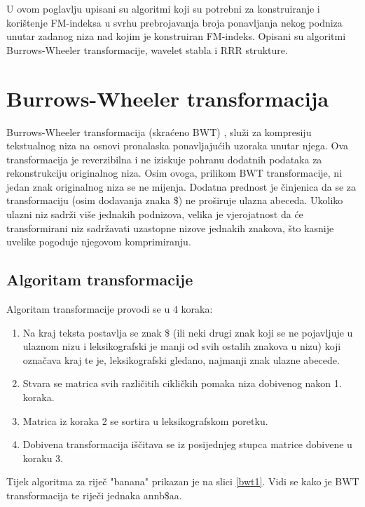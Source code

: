 U ovom poglavlju upisani su algoritmi koji su potrebni za konstruiranje i korištenje FM-indeksa u svrhu prebrojavanja broja ponavljanja nekog podniza unutar zadanog niza nad kojim je konstruiran FM-indeks. Opisani su algoritmi Burrows-Wheeler transformacije, wavelet stabla i RRR strukture.


\section{Burrows-Wheeler transformacija}
Burrows-Wheeler transformacija (skraćeno BWT) \cite{bwt1}, služi za kompresiju tekstualnog niza na osnovi pronalaska ponavljajućih uzoraka unutar njega. Ova transformacija je reverzibilna i ne iziskuje pohranu dodatnih podataka za rekonstrukciju originalnog niza. Osim ovoga, prilikom BWT transformacije, ni jedan znak originalnog niza se ne mijenja. Dodatna prednost je činjenica da se za transformaciju (osim dodavanja znaka \$) ne proširuje ulazna abeceda. Ukoliko ulazni niz sadrži više jednakih podnizova, velika je vjerojatnost da će transformirani niz sadržavati uzastopne nizove jednakih znakova, što kasnije uvelike pogoduje njegovom komprimiranju.

\subsection{Algoritam transformacije}
Algoritam transformacije provodi se u 4 koraka:

\begin{enumerate}
  \item Na kraj teksta postavlja se znak \$ (ili neki drugi znak koji se ne pojavljuje u ulaznom nizu i leksikografski je manji od svih ostalih znakova u nizu) koji označava kraj te je, leksikografski gledano, najmanji znak ulazne abecede.
  \item Stvara se matrica svih različitih cikličkih pomaka niza dobivenog nakon 1. koraka.
  \item Matrica iz koraka 2 se sortira u leksikografskom poretku.
  \item Dobivena transformacija iščitava se iz posijednjeg stupca matrice dobivene u koraku 3.

\end{enumerate}

Tijek algoritma za riječ "banana" prikazan je na slici \ref{bwt1}. Vidi se kako je BWT transformacija te riječi jednaka annb\$aa. 


